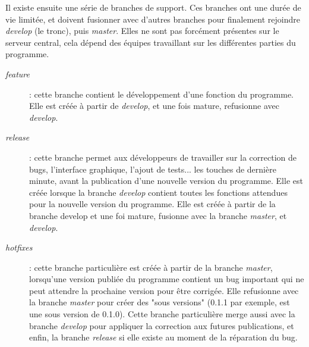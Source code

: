 Il existe ensuite une série de branches de support.
Ces branches ont une durée de vie limitée, et doivent fusionner avec d'autres branches pour finalement rejoindre \emph{develop} (le tronc), puis \emph{master}.
Elles ne sont pas forcément présentes sur le serveur central, cela dépend des équipes travaillant sur les différentes parties du programme.
\begin{description}
  \item[\emph{feature}] : cette branche contient le développement d'une fonction du programme. Elle est créée à partir de \emph{develop}, et une fois mature, refusionne avec \emph{develop}.
  \item[\emph{release}] : cette branche permet aux développeurs de travailler sur la correction de bugs, l'interface graphique, l'ajout de tests... les touches de dernière minute, avant la publication d'une nouvelle version du programme. Elle est créée lorsque la branche \emph{develop} contient toutes les fonctions attendues pour la nouvelle version du programme. Elle est créée à partir de la branche develop et une foi mature, fusionne avec la branche \emph{master}, et \emph{develop}.
  \item[\emph{hotfixes}] : cette branche particulière est créée à partir de la branche \emph{master}, lorsqu'une version publiée du programme contient un bug important qui ne peut attendre la prochaine version pour être corrigée. Elle refusionne avec la branche \emph{master} pour créer des "sous versions" (0.1.1 par exemple, est une sous version de 0.1.0). Cette branche particulière merge aussi avec la branche \emph{develop} pour appliquer la correction aux futures publications, et enfin, la branche \emph{release} si elle existe au moment de la réparation du bug.
\end{description}

